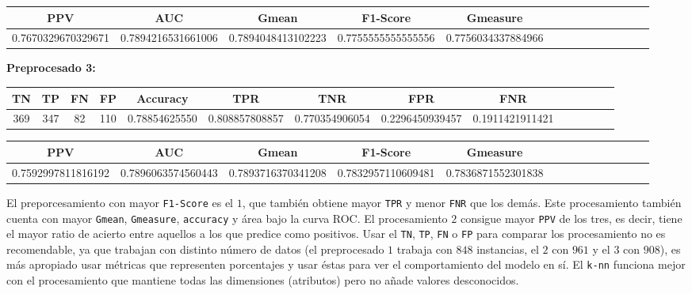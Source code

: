 \documentclass[a4]{article}
\begin{document}
\begin{center}
\begin{tabular}{|c|c|c|c|c|c|c|c|c|c|c|c|c|c|}
\hline
\multicolumn{1}{|c|}{\textbf{PPV}} & \textbf{AUC} & \textbf{Gmean} & \textbf{F1-Score} & \textbf{Gmeasure}  \\ \hline
  0.7670329670329671 & 0.7894216531661006 & 0.7894048413102223 & 0.7755555555555556 & 0.7756034337884966 \\ \hline
\end{tabular}
\end{center}

\textbf{Preprocesado 3:}
\begin{center}
\begin{tabular}{|c|c|c|c|c|c|c|c|c|c|c|c|c|c|}
\hline
\multicolumn{1}{|c|}{\textbf{TN}}& \textbf{TP} & \textbf{FN} & \textbf{FP} & \textbf{Accuracy} & \textbf{TPR} & \textbf{TNR} & \textbf{FPR} &\textbf{FNR} \\ \hline
  369 & 347 & 82 & 110 & 0.78854625550 & 0.808857808857 & 0.770354906054 & 0.2296450939457 & 0.1911421911421 \\ \hline
\end{tabular}
\end{center}

\begin{center}
\begin{tabular}{|c|c|c|c|c|c|c|c|c|c|c|c|c|c|}
\hline
\multicolumn{1}{|c|}{\textbf{PPV}} & \textbf{AUC} & \textbf{Gmean} & \textbf{F1-Score} & \textbf{Gmeasure}  \\ \hline
  0.7592997811816192 & 0.7896063574560443 & 0.7893716370341208 & 0.7832957110609481 & 0.7836871552301838  \\ \hline
\end{tabular}
\end{center}

\vspace{1mm}

El preporcesamiento con mayor \texttt{F1-Score} es el $1$, que también obtiene mayor \texttt{TPR} y menor \texttt{FNR} que los demás. Este procesamiento también cuenta con mayor \texttt{Gmean}, \texttt{Gmeasure}, \texttt{accuracy} y área bajo la curva ROC. El procesamiento $2$ consigue mayor \texttt{PPV} de los tres, es decir, tiene el mayor ratio de acierto entre aquellos a los que predice como positivos. Usar el \texttt{TN}, \texttt{TP}, \texttt{FN} o \texttt{FP} para comparar los procesamiento no es recomendable, ya que trabajan con distinto número de datos (el preprocesado $1$ trabaja con $848$ instancias, el $2$ con $961$ y el $3$ con $908$), es más apropiado usar métricas que representen porcentajes y usar éstas para ver el comportamiento del modelo en sí. El \texttt{k-nn} funciona mejor con el procesamiento que mantiene todas las dimensiones (atributos) pero no añade valores desconocidos.
\end{document}
